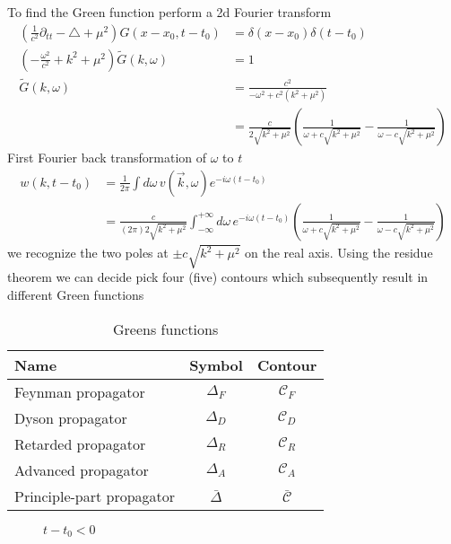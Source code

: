 \documentclass[../main.tex]{subfiles}
\begin{document}
\begin{itemize}
\begin{enumerate}
To find the Green function perform a 2d Fourier transform
\begin{align}
\left(\frac{1}{c^2}\partial_{tt}-\triangle+\mu^2\right) G(x-x_0,t-t_0)&= \delta(x-x_0)\delta(t-t_0)\\
\left(-\frac{\omega^2}{c^2}+k^2+\mu^2\right)\tilde{G}(k,\omega)&=1\\
\tilde{G}(k,\omega)
&=\frac{c^2}{-\omega^2+c^2(k^2+\mu^2)}\\
&=\frac{c}{2\sqrt{k^2+\mu^2}}\left(\frac{1}{\omega+c\sqrt{k^2+\mu^2}}-\frac{1}{\omega-c\sqrt{k^2+\mu^2}}\right)
\end{align}
First Fourier back transformation of $\omega$ to $t$
\begin{align}
w(k,t-t_0)&=\frac{1}{2\pi}\int d\omega\,v(\vec{k},\omega)e^{-i\omega(t-t_0)}\\
&=\frac{c}{(2\pi)2\sqrt{k^2+\mu^2}}\int_{-\infty}^{+\infty} d\omega\,e^{-i\omega(t-t_0)}\left(\frac{1}{\omega+c\sqrt{k^2+\mu^2}}-\frac{1}{\omega-c\sqrt{k^2+\mu^2}}\right)
\end{align}
we recognize the two poles at $\pm c\sqrt{k^2+\mu^2}$ on the real axis. Using the residue theorem we can decide pick four (five) contours which subsequently result in different Green functions

\begin{table}
\centering
\begin{tabular}{|l|c|c|}
\hline 
Name & Symbol & Contour \\ 
\hline 
Feynman propagator        & $\Delta_F$     & $\mathcal{C}_F$ \\
Dyson propagator          & $\Delta_D$     & $\mathcal{C}_D$ \\
Retarded propagator       & $\Delta_R$     & $\mathcal{C}_R$ \\
Advanced propagator       & $\Delta_A$     & $\mathcal{C}_A$ \\
Principle-part propagator & $\bar{\Delta}$ & $\bar{\mathcal{C}}$ \\
\hline 
\end{tabular} 
\caption{Greens functions}
\end{table}

\begin{figure}[!h]
$t-t_0<0$\newline
\begin{center}
\end{center}
\end{figure}
\end{enumerate}
\end{itemize}
\end{document}
